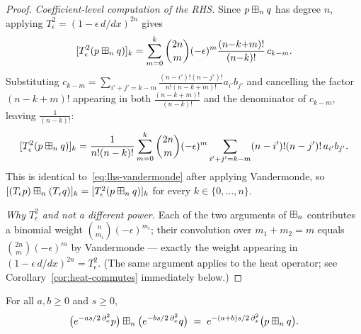 \begin{proof}
\smallskip\noindent\textit{Coefficient-level computation of the RHS.}
Since $p\boxplus_n q$ has degree $n$, applying
$T_\epsilon^2=(1-\epsilon\,d/dx)^{2n}$ gives
\[
[T_\epsilon^2(p\boxplus_n q)]_k
= \sum_{m=0}^k\binom{2n}{m}(-\epsilon)^m\frac{(n{-}k{+}m)!}{(n{-}k)!}\,c_{k-m}.
\]
Substituting $c_{k-m}=\sum_{i'+j'=k-m}\frac{(n-i')!(n-j')!}{n!(n-k+m)!}a_{i'}b_{j'}$
and cancelling the factor $(n{-}k{+}m)!$ appearing in both $\frac{(n{-}k{+}m)!}{(n{-}k)!}$
and the denominator of $c_{k-m}$, leaving $\frac{1}{(n{-}k)!}$:
\[
[T_\epsilon^2(p\boxplus_n q)]_k
= \frac{1}{n!(n-k)!}\sum_{m=0}^k\binom{2n}{m}(-\epsilon)^m
  \sum_{i'+j'=k-m}(n-i')!(n-j')!\,a_{i'}b_{j'}.
\]
This is identical to~\eqref{eq:lhs-vandermonde} after applying Vandermonde,
so $[(T_\epsilon p)\boxplus_n(T_\epsilon q)]_k=[T_\epsilon^2(p\boxplus_n q)]_k$ for
every $k\in\{0,\dots,n\}$.

\smallskip\noindent\textit{Why $T_\epsilon^2$ and not a different power.}
Each of the two arguments of $\boxplus_n$ contributes a binomial weight
$\binom{n}{m_i}(-\epsilon)^{m_i}$; their convolution over $m_1+m_2=m$
equals $\binom{2n}{m}(-\epsilon)^m$ by Vandermonde — exactly the weight
appearing in $(1-\epsilon\,d/dx)^{2n}=T_\epsilon^2$.
(The same argument applies to the heat operator; see
Corollary~\ref{cor:heat-commutes} immediately below.)
\end{proof}

\begin{qfourcorollary}\label{cor:heat-commutes}
For all $a,b\ge0$ and $s\ge0$,
\[
\bigl(e^{-as/2\,\partial_x^2}p\bigr)\boxplus_n\bigl(e^{-bs/2\,\partial_x^2}q\bigr)
\;=\;e^{-(a+b)s/2\,\partial_x^2}\bigl(p\boxplus_n q\bigr).
\]
\end{qfourcorollary}

